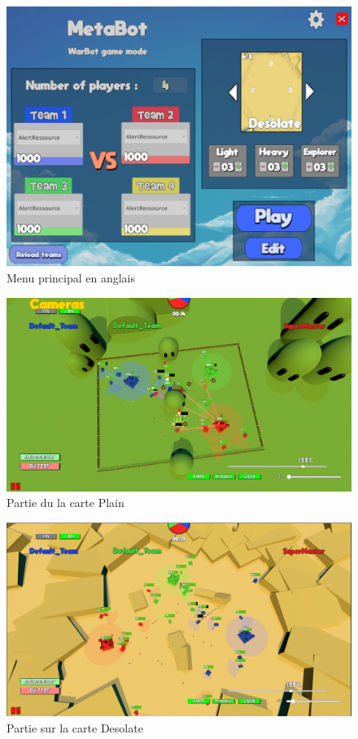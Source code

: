 \documentclass{report}
\begin{document}
\begin{figure}[h]
	\centering
		\includegraphics[scale=0.6]{MainMenuAnglais}
	\caption{Menu principal en anglais}
\end{figure}

\begin{figure}[h]
	\centering
		\includegraphics[scale=0.5]{PlainDemo}
	\caption{Partie du la carte Plain}
\end{figure}

\begin{figure}[h]
	\centering
		\includegraphics[scale=0.5]{DesolateDemo}
	\caption{Partie sur la carte Desolate}
\end{figure}
\end{document}
